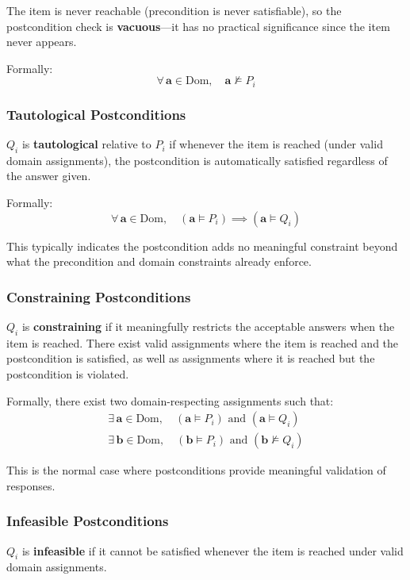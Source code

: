 The item is never reachable (precondition is never satisfiable), so the postcondition check is \textbf{vacuous}—it has no practical significance since the item never appears.

Formally:
\[
    \forall\,\mathbf{a} \in \mathrm{Dom}, \quad \mathbf{a} \not\models P_i
\]

\subsubsection{Tautological Postconditions}

$Q_i$ is \textbf{tautological} relative to $P_i$ if whenever the item is reached (under valid domain assignments), the postcondition is automatically satisfied regardless of the answer given.

Formally:
\[
    \forall\,\mathbf{a} \in \mathrm{Dom}, \quad (\mathbf{a} \models P_i) \implies (\mathbf{a} \models Q_i)
\]

This typically indicates the postcondition adds no meaningful constraint beyond what the precondition and domain constraints already enforce.

\subsubsection{Constraining Postconditions}

$Q_i$ is \textbf{constraining} if it meaningfully restricts the acceptable answers when the item is reached. There exist valid assignments where the item is reached and the postcondition is satisfied, as well as assignments where it is reached but the postcondition is violated.

Formally, there exist two domain-respecting assignments such that:
\[
\begin{array}{l}
\exists\,\mathbf{a} \in \mathrm{Dom}, \quad (\mathbf{a} \models P_i) \text{ and } (\mathbf{a} \models Q_i) \\
\exists\,\mathbf{b} \in \mathrm{Dom}, \quad (\mathbf{b} \models P_i) \text{ and } (\mathbf{b} \not\models Q_i)
\end{array}
\]

This is the normal case where postconditions provide meaningful validation of responses.

\subsubsection{Infeasible Postconditions}

$Q_i$ is \textbf{infeasible} if it cannot be satisfied whenever the item is reached under valid domain assignments.


